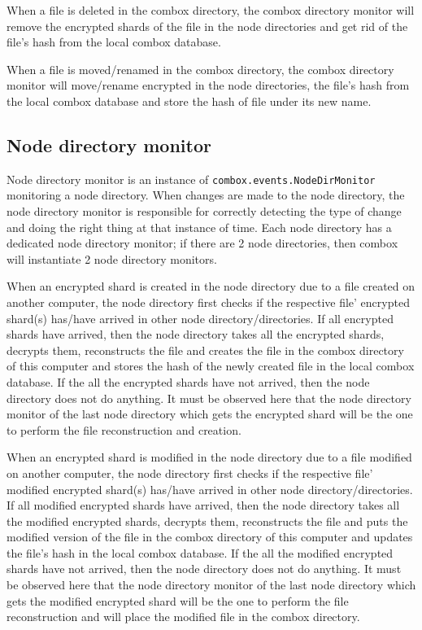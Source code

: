 When a file is deleted in the combox directory, the combox directory
monitor will remove the encrypted shards of the file in the node
directories and get rid of the file's hash from the local combox
database.

When a file is moved/renamed in the combox directory, the combox
directory monitor will move/rename encrypted in the node directories,
the file's hash from the local combox database and store the hash of
file under its new name.

\subsection{Node directory monitor}\label{sec:4-combox-nodirm}

Node directory monitor is an instance of
\verb+combox.events.NodeDirMonitor+ monitoring a node directory. When
changes are made to the node directory, the node directory monitor is
responsible for correctly detecting the type of change and doing the
right thing at that instance of time. Each node directory has a
dedicated node directory monitor; if there are 2 node directories,
then combox will instantiate 2 node directory monitors.

When an encrypted shard is created in the node directory due to a file
created on another computer, the node directory first checks if the
respective file' encrypted shard(s) has/have arrived in other node
directory/directories. If all encrypted shards have arrived, then the
node directory takes all the encrypted shards, decrypts them,
reconstructs the file and creates the file in the combox directory of
this computer and stores the hash of the newly created file in the
local combox database. If the all the encrypted shards have not
arrived, then the node directory does not do anything. It must be
observed here that the node directory monitor of the last node
directory which gets the encrypted shard will be the one to perform
the file reconstruction and creation.

When an encrypted shard is modified in the node directory due to a
file modified on another computer, the node directory first checks if
the respective file' modified encrypted shard(s) has/have arrived in
other node directory/directories. If all modified encrypted shards
have arrived, then the node directory takes all the modified encrypted
shards, decrypts them, reconstructs the file and puts the modified
version of the file in the combox directory of this computer and
updates the file's hash in the local combox database. If the all the
modified encrypted shards have not arrived, then the node directory
does not do anything. It must be observed here that the node directory
monitor of the last node directory which gets the modified encrypted
shard will be the one to perform the file reconstruction and will place
the modified file in the combox directory.

